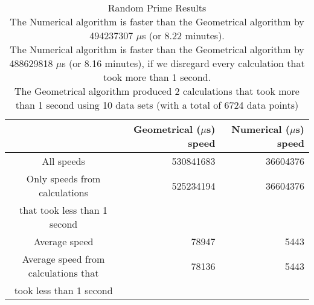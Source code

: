 \begin{table}[bth!]\footnotesize
 \begin{tabular}[3]{c|r|r}
 & Geometrical ($\mu$s) speed & Numerical ($\mu$s) speed\\
\hline
All speeds & 530841683 & 36604376 \\ 
\hline 
Only speeds from calculations & 525234194 & 36604376 \\ 
that took less than 1 second & & \\ 
\hline
Average speed & 78947 & 5443 \\
\hline
Average speed from calculations that & 78136 & 5443 \\ 
took less than 1 second & & \\ 
\end{tabular}\\ \\
\caption{Random Prime Results\\
The Numerical algorithm is faster than the Geometrical algorithm by 494237307 $\mu$s (or 8.22 minutes).\\
The Numerical algorithm is faster than the Geometrical algorithm by 488629818 $\mu$s (or 8.16 minutes), if we disregard every calculation that took more than 1 second.\\
The Geometrical algorithm produced 2 calculations that took more than 1 second using 10 data sets (with a total of 6724 data points)}\label{prime-random_speedtable}\end{table}